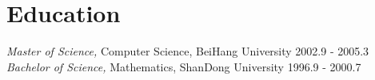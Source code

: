 
\section{Education}

{\em Master of Science,} Computer Science, BeiHang University \hfill 2002.9 - 2005.3
\\
{\em Bachelor of Science,} Mathematics, ShanDong University \hfill 1996.9 - 2000.7

